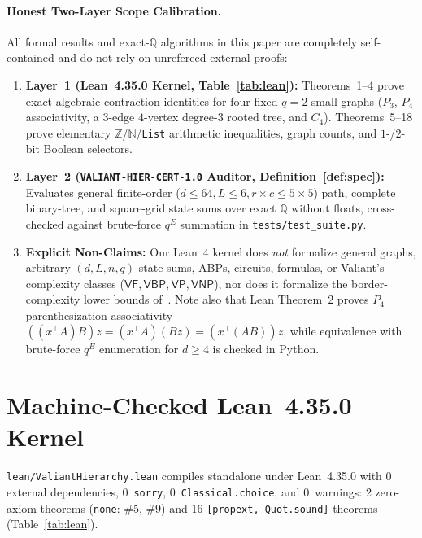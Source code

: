 \documentclass[10pt,twocolumn]{article}
\newcommand{\QQ}{\mathbb{Q}}
\newcommand{\ZZ}{\mathbb{Z}}
\newcommand{\NN}{\mathbb{N}}
\newcommand{\certschema}{\texttt{VALIANT-HIER-CERT-1.0}}
\begin{document}
\paragraph{Honest Two-Layer Scope Calibration.}
All formal results and exact-$\QQ$ algorithms in this paper are completely self-contained and do not rely on unrefereed external proofs:
\begin{enumerate}[leftmargin=1.2em,itemsep=1pt,topsep=2pt]
  \item \textbf{Layer~1 (Lean~4.35.0 Kernel, Table~\ref{tab:lean}):} Theorems~1--4 prove exact algebraic contraction identities for four fixed $q=2$ small graphs ($P_3$, $P_4$ associativity, a $3$-edge $4$-vertex degree-$3$ rooted tree, and $C_4$). Theorems~5--18 prove elementary $\ZZ$/$\NN$/\texttt{List} arithmetic inequalities, graph counts, and $1$-/$2$-bit Boolean selectors.
  \item \textbf{Layer~2 (\certschema{} Auditor, Definition~\ref{def:spec}):} Evaluates general finite-order ($d\le 64, L\le 6, r\times c\le 5\times 5$) path, complete binary-tree, and square-grid state sums over exact $\QQ$ without floats, cross-checked against brute-force $q^E$ summation in \texttt{tests/test\_suite.py}.
  \item \textbf{Explicit Non-Claims:} Our Lean~4 kernel does \emph{not} formalize general graphs, arbitrary $(d,L,n,q)$ state sums, ABPs, circuits, formulas, or Valiant's complexity classes ($\mathsf{VF},\mathsf{VBP},\mathsf{VP},\mathsf{VNP}$), nor does it formalize the border-complexity lower bounds of~\cite{openai2026hierarchy,openai2026vpvnp}. Note also that Lean Theorem~2 proves $P_4$ parenthesization associativity $((x^\top A)B)z = (x^\top A)(Bz) = (x^\top(AB))z$, while equivalence with brute-force $q^E$ enumeration for $d\ge 4$ is checked in Python.
\end{enumerate}

\section{Machine-Checked Lean~4.35.0 Kernel}\label{sec:lean}
\texttt{lean/ValiantHierarchy.lean} compiles standalone under Lean~4.35.0 with $0$ external dependencies, $0$~\texttt{sorry}, $0$~\texttt{Classical.choice}, and $0$~warnings: 2 zero-axiom theorems (\texttt{none}: \#5, \#9) and 16 \texttt{[propext, Quot.sound]} theorems (Table~\ref{tab:lean}).
\end{document}
